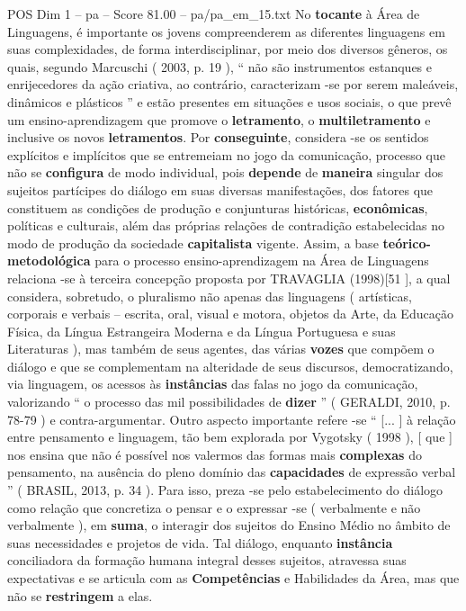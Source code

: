 \begin{textsample}{POS Dim 1 – pa – Score 81.00 – pa/pa\_em\_15.txt}
No \textbf{tocante} à Área de Linguagens, é importante os jovens compreenderem as diferentes linguagens em suas complexidades, de forma interdisciplinar, por meio dos diversos gêneros, os quais, segundo Marcuschi ( 2003, p. 19 ), “ não são instrumentos estanques e enrijecedores da ação criativa, ao contrário, caracterizam -se por serem maleáveis, dinâmicos e plásticos ” e estão presentes em situações e usos sociais, o que prevê um ensino-aprendizagem que promove o \textbf{letramento}, o \textbf{multiletramento} e inclusive os novos \textbf{letramentos}.
Por \textbf{conseguinte}, considera -se os sentidos explícitos e implícitos que se entremeiam no jogo da comunicação, processo que não se \textbf{configura} de modo individual, pois \textbf{depende} de \textbf{maneira} singular dos sujeitos partícipes do diálogo em suas diversas manifestações, dos fatores que constituem as condições de produção e conjunturas históricas, \textbf{econômicas}, políticas e culturais, além das próprias relações de contradição estabelecidas no modo de produção da sociedade \textbf{capitalista} vigente.
Assim, a base \textbf{teórico-metodológica} para o processo ensino-aprendizagem na Área de Linguagens relaciona -se à terceira concepção proposta por TRAVAGLIA (1998)[51 ], a qual considera, sobretudo, o pluralismo não apenas das linguagens ( artísticas, corporais e verbais – escrita, oral, visual e motora, objetos da Arte, da Educação Física, da Língua Estrangeira Moderna e da Língua Portuguesa e suas Literaturas ), mas também de seus agentes, das várias \textbf{vozes} que compõem o diálogo e que se complementam na alteridade de seus discursos, democratizando, via linguagem, os acessos às \textbf{instâncias} das falas no jogo da comunicação, valorizando “ o processo das mil possibilidades de \textbf{dizer} ” ( GERALDI, 2010, p. 78-79 ) e contra-argumentar.
Outro aspecto importante refere -se “ [... ] à relação entre pensamento e linguagem, tão bem explorada por Vygotsky ( 1998 ), [ que ] nos ensina que não é possível nos valermos das formas mais \textbf{complexas} do pensamento, na ausência do pleno domínio das \textbf{capacidades} de expressão verbal ” ( BRASIL, 2013, p. 34 ).
Para isso, preza -se pelo estabelecimento do diálogo como relação que concretiza o pensar e o expressar -se ( verbalmente e não verbalmente ), em \textbf{suma}, o interagir dos sujeitos do Ensino Médio no âmbito de suas necessidades e projetos de vida.
Tal diálogo, enquanto \textbf{instância} conciliadora da formação humana integral desses sujeitos, atravessa suas expectativas e se articula com as \textbf{Competências} e Habilidades da Área, mas que não se \textbf{restringem} a elas.

\end{textsample}
